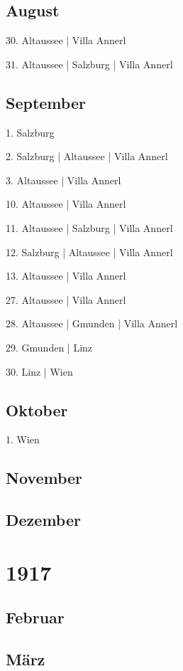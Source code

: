 \documentclass[twoside=false,titlepage=false,open=any, parskip=never, fontsize=10pt, headings=small, chapterprefix=false, appendixprefix=false, DIV=15]{scrbook}
\begin{document}
\begin{multicols}{3}
            \section*{August}
            30. Altaussee | Villa Annerl\par
            31. Altaussee | Salzburg | Villa Annerl\par
            \section*{September}
            1. Salzburg\par
            2. Salzburg | Altaussee | Villa Annerl\par
            3. Altaussee | Villa Annerl\par
            10. Altaussee | Villa Annerl\par
            11. Altaussee | Salzburg | Villa Annerl\par
            12. Salzburg | Altaussee | Villa Annerl\par
            13. Altaussee | Villa Annerl\par
            27. Altaussee | Villa Annerl\par
            28. Altaussee | Gmunden | Villa Annerl\par
            29. Gmunden | Linz\par
            30. Linz | Wien\par
            \section*{Oktober}
            1. Wien\par
            \section*{November}
            \section*{Dezember}
            \chapter*{1917}
            \section*{Februar}
            \section*{März}

\end{multicols}
\end{document}
